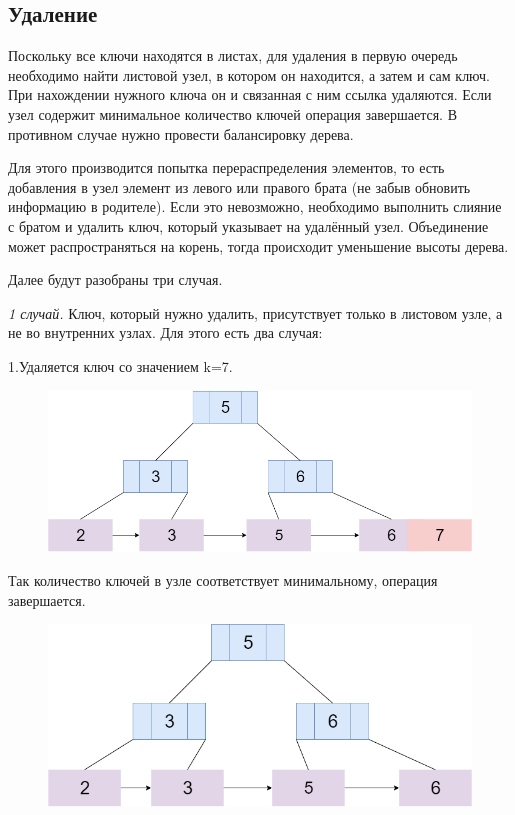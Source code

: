 \documentclass{article}
\begin{document}
\subsection{Удаление}
  Поскольку все ключи находятся в листах, для удаления в первую очередь необходимо найти листовой узел, в котором он находится, а затем и сам ключ. При нахождении нужного ключа он и связанная с ним ссылка удаляются. Если узел содержит минимальное количество ключей операция завершается. В противном случае нужно провести балансировку дерева.

  Для этого производится попытка перераспределения элементов, то есть добавления в узел элемент из левого или правого брата (не забыв обновить информацию в родителе). Если это невозможно, необходимо выполнить слияние с братом и удалить ключ, который указывает на удалённый узел. Объединение может распространяться на корень, тогда происходит уменьшение высоты дерева.

   Далее будут разобраны три случая.

   \textit{1 случай.} Ключ, который нужно удалить, присутствует только в листовом узле, а не во внутренних узлах. Для этого есть два случая:
   
   1.Удаляется ключ со значением k=7. 
   \begin{figure}
   \includegraphics[scale=0.4]{dell1.png}

\caption{}
\end{figure}


   Так количество ключей в узле соответствует минимальному, операция завершается.
   \begin{figure}
   \includegraphics[scale=0.4]{dell2.png}

\caption{}
\end{figure}
   
\end{document}

